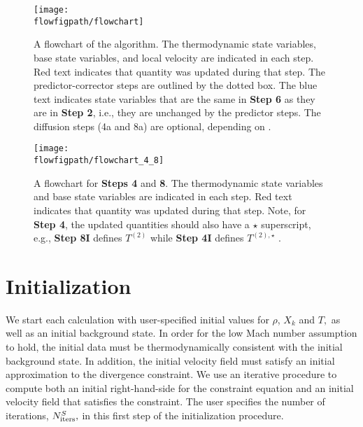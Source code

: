 \begin{figure}[tb]
\centering
\texttt{[image: \\flowfigpath/flowchart]}
\caption[Graphical flowchart of \maestroex]
  {\label{Fig:flowchart} A flowchart of the algorithm.  The
  thermodynamic state variables, base state variables, and local velocity are
  indicated in each step.  Red text indicates that quantity was
  updated during that step.  The predictor-corrector steps are
  outlined by the dotted box.  The blue text indicates state
  variables that are the same in {\bf Step 6} as they are in
  {\bf Step 2}, i.e., they are unchanged by the predictor steps.
  The diffusion steps (4a and 8a) are optional, depending on
  .}
\end{figure}
\begin{figure}[tb]                                               
\centering
\texttt{[image: \\flowfigpath/flowchart\_4\_8]}
\caption[Graphical flowchart of the density and enthalpy update steps]
{\label{Fig:flowchart48} A flowchart for {\bf Steps 4} and {\bf 8}.
  The thermodynamic state variables and base state variables are
  indicated in each step.  Red text indicates that quantity was
  updated during that step.  Note, for {\bf Step 4}, the updated
  quantities should also have a $\star$ superscript, e.g., {\bf Step
    8I} defines $T^{(2)}$ while {\bf Step 4I} defines $T^{(2),\star}$
  .}
\end{figure}



\section{Initialization}\label{Sec:Initialization}

\label{sec:flow:initialization}
 
We start each calculation with user-specified initial values for
$\rho$, $X_k$ and $T,$ as well as an initial background state.  In
order for the low Mach number assumption to hold, the initial data
must be thermodynamically consistent with the initial background
state.  In addition, the initial velocity field must satisfy an
initial approximation to the divergence constraint.  We use an iterative
procedure to compute both an initial right-hand-side for the
constraint equation and an initial velocity field that satisfies
the constraint.  The user specifies the number of iterations,
$N_{\rm iters}^{S},$ in this first step of the initialization procedure.

